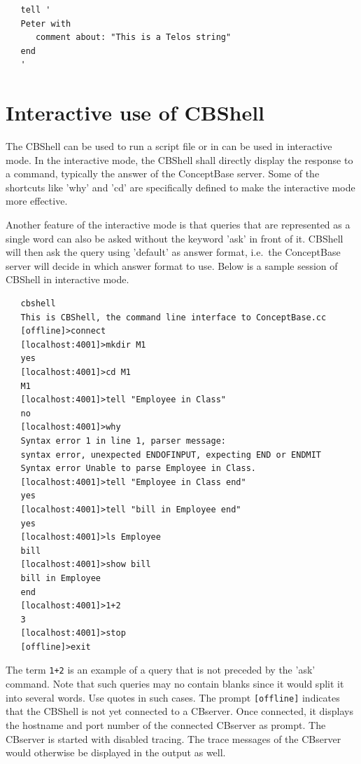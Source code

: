 \begin{verbatim}
   tell '
   Peter with 
      comment about: "This is a Telos string"
   end
   '
\end{verbatim}



\section{Interactive use of CBShell}
\label{sec:cbshellinteractive}

The CBShell can be used to run a script file or in can be used in interactive mode.
In the interactive mode, the CBShell shall directly display the response to a command,
typically the answer of the ConceptBase server. Some of the shortcuts like 'why' and
'cd' are specifically defined to make the interactive mode more effective.

Another feature of the interactive mode is that queries that are represented as a single 
word can also be asked without the keyword 'ask' in front of it. CBShell will then ask
the query using 'default' as answer format, i.e.\ the ConceptBase server will decide
in which answer format to use. Below is a sample session of CBShell in interactive mode.

\begin{verbatim}
   cbshell
   This is CBShell, the command line interface to ConceptBase.cc
   [offline]>connect
   [localhost:4001]>mkdir M1
   yes
   [localhost:4001]>cd M1
   M1
   [localhost:4001]>tell "Employee in Class"
   no
   [localhost:4001]>why         
   Syntax error 1 in line 1, parser message:
   syntax error, unexpected ENDOFINPUT, expecting END or ENDMIT
   Syntax error Unable to parse Employee in Class.
   [localhost:4001]>tell "Employee in Class end"
   yes
   [localhost:4001]>tell "bill in Employee end"
   yes
   [localhost:4001]>ls Employee
   bill
   [localhost:4001]>show bill
   bill in Employee  
   end 
   [localhost:4001]>1+2
   3
   [localhost:4001]>stop
   [offline]>exit
\end{verbatim}


The term {\tt 1+2} is an example of a query that is not preceded by the 'ask' command. Note that such queries
may no contain blanks since it would split it into several words. Use quotes in such cases.
The prompt {\tt [offline]} indicates that the CBShell is not yet connected to a CBserver. Once connected,  
it displays the hostname and port number of the connected CBserver as prompt.
The CBserver is started with disabled tracing. The trace messages of the CBserver would otherwise 
be displayed in the output as well.


